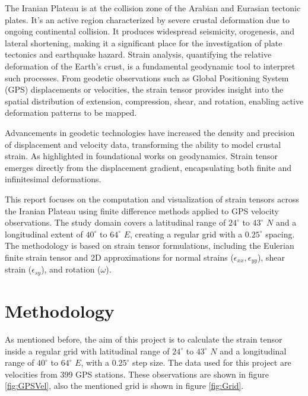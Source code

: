\documentclass[12pt]{article}
\begin{document}
	The Iranian Plateau  is at the collision zone of the Arabian and Eurasian tectonic plates. It's an active region characterized by severe crustal deformation due to ongoing continental collision. It produces widespread seismicity, orogenesis, and lateral shortening, making it a significant place for the investigation of plate tectonics and earthquake hazard. Strain analysis, quantifying the relative deformation of the Earth's crust, is a fundamental geodynamic tool to interpret such processes. From geodetic observations such as Global Positioning System (GPS) displacements or velocities, the strain tensor provides insight into the spatial distribution of extension, compression, shear, and rotation, enabling active deformation patterns to be mapped.
	
	Advancements in geodetic technologies have increased the density and precision of displacement and velocity data, transforming the ability to model crustal strain. As highlighted in foundational works on geodynamics. Strain tensor emerges directly from the displacement gradient, encapsulating both finite and infinitesimal deformations.
	
	This report focuses on the computation and visualization of strain tensors across the Iranian Plateau using finite difference methods applied to GPS velocity observations. The study domain covers a latitudinal range of $24^\circ$ to $43^\circ$ $N$ and a longitudinal extent of $40^\circ$ to $64^\circ$ $E$, creating a regular grid with a $0.25^\circ$ spacing. The methodology is based on strain tensor formulations, including the Eulerian finite strain tensor and 2D approximations for normal strains ($\epsilon_{xx}, \epsilon_{yy}$), shear strain ($\epsilon_{sy}$), and rotation ($\omega$).

	\section{Methodology}
	
	As mentioned before, the aim of this project is to calculate the strain tensor inside a regular grid with latitudinal range of $24^\circ$ to $43^\circ$ $N$ and a longitudinal range of $40^\circ$ to $64^\circ$ $E$, with a $0.25^\circ$ step size. The data used for this project are velocities from 399 GPS stations. These observations are shown in figure \ref{fig:GPSVel}, also the mentioned grid is shown in figure \ref{fig:Grid}.
	
\end{document}
